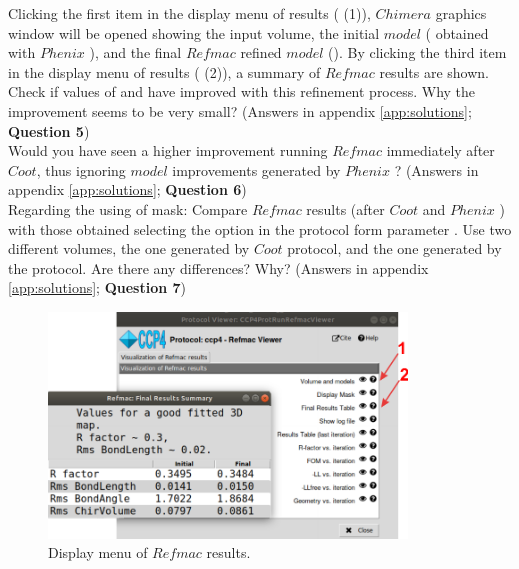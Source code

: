 \begin{itemize}
  Clicking the first item in the display menu of results ( (1)), $Chimera$ graphics window will be opened showing the input volume, the initial $model$ ( obtained with $Phenix$ ), and the final $Refmac$ refined $model$ (). By clicking the third item in the display menu of results ( (2)), a summary of $Refmac$ results are shown. Check if values of  and  have improved with this refinement process. Why the improvement seems to be very small? (Answers in appendix \ref{app:solutions}; \textbf{Question 5})\\
  
  Would you have seen a higher improvement running $Refmac$ immediately after $Coot$, thus ignoring $model$ improvements generated by $Phenix$ ? (Answers in appendix \ref{app:solutions}; \textbf{Question 6})\\
  
  Regarding the using of mask: Compare $Refmac$ results (after $Coot$ and $Phenix$ ) with those obtained selecting the option  in the protocol form parameter . Use two different volumes, the one generated by $Coot$ protocol, and the one generated by the  protocol. Are there any differences? Why? (Answers in appendix \ref{app:solutions}; \textbf{Question 7})\\
  
  \begin{figure}[H]
  \centering 
  \captionsetup{width=.7\linewidth} 
  \includegraphics[width=0.85\textwidth]{Images/Fig32}
  \caption{Display menu of $Refmac$ results.}
  \label{fig:refmac_display_results}
  \end{figure}
  

\end{itemize}

